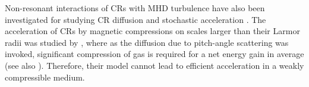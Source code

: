 \documentclass[preprint2,twocolumn,times,tighten]{aastex63}
\begin{document}

Non-resonant interactions of CRs with %
MHD turbulence have also been investigated for studying CR diffusion and stochastic acceleration
\citep{Noe68,CesK73,Ptuskin88,Klep95,CL06,Brunetti_Laz,Med15,BruL16,XZ17,Bres22,LXm21}.
The acceleration of CRs by magnetic compressions on scales larger than their Larmor radii was studied by 
\citet{CL06},
where
as the diffusion due to pitch-angle scattering was invoked, 
significant compression of gas is required for 
a net energy gain in average
(see also \citealt{Druf12}).
Therefore, their model cannot lead to efficient acceleration in a weakly compressible medium. 
\end{document}
